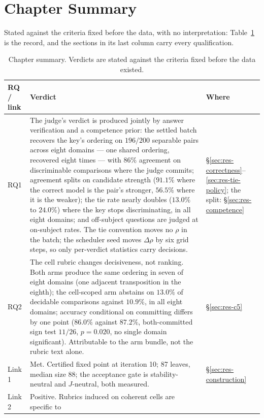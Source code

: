 \section{Chapter Summary}\label{sec:res-summary}

Stated against the criteria fixed before the data, with no
interpretation: Table~\ref{tab:res-summary} is the record, and the
sections in its last column carry every qualification.

\begin{table}[htbp]
\centering
\small
\caption{Chapter summary. Verdicts are stated against the criteria
fixed before the data existed.}
\label{tab:res-summary}
\begin{tabular}{p{1.4cm}p{7.8cm}p{3.2cm}}
\toprule
RQ / link & Verdict & Where \\
\midrule
RQ1 & The judge's verdict is produced jointly by answer verification
and a competence prior: the settled batch recovers the key's ordering
on $196/200$ separable pairs across eight domains --- one shared
ordering, recovered eight times --- with $86\%$ agreement on
discriminable comparisons where the judge commits; agreement splits
on candidate strength ($91.1\%$ where the correct model is the
pair's stronger, $56.5\%$ where it is the weaker); the
tie rate nearly doubles ($13.0\%$ to $24.0\%$) where the key stops
discriminating, in all eight domains; and off-subject questions are
judged at on-subject rates. The tie convention moves no $\rho$ in the
batch; the scheduler seed moves $\Delta\rho$ by six grid steps, so
only per-verdict statistics carry decisions. &
\S\ref{sec:res-correctness}--\ref{sec:res-tie-policy}; the split:
\S\ref{sec:res-competence} \\
\addlinespace
RQ2 & The cell rubric changes decisiveness, not ranking. Both arms
produce the same ordering in seven of eight domains (one adjacent
transposition in the eighth); the cell-scoped arm abstains on
$13.0\%$ of decidable comparisons against $10.9\%$, in all eight
domains; accuracy conditional on committing differs by one point
($86.0\%$ against $87.2\%$, both-committed sign test $11/26$,
$p = 0.020$, no single domain significant). Attributable to the arm
bundle, not the rubric text alone. &
\S\ref{sec:res-c5} \\
\addlinespace
Link 1 & Met. Certified fixed point at iteration 10; 87 leaves, median
size 88; the acceptance gate is stability-neutral and $J$-neutral,
both measured. &
\S\ref{sec:res-construction} \\
\addlinespace
Link 2 & Positive. Rubrics induced on coherent cells are specific to

\end{tabular}
\end{table}
